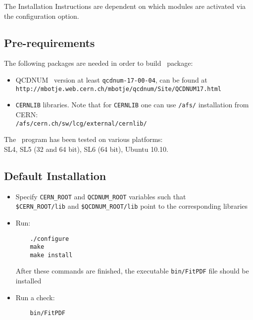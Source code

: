 
\label{sec:install}

The Installation Instructions are dependent on which modules are activated via the configuration option. 
\subsection{Pre-requirements}

The following packages are needed in order to build \fitter\ package:
\begin{itemize}
\item QCDNUM~\cite{qcdnum} version at least {\tt qcdnum-17-00-04}, can be found at \\
  {\tt http://mbotje.web.cern.ch/mbotje/qcdnum/Site/QCDNUM17.html}
\item {\tt CERNLIB} libraries. Note that for {\tt CERNLIB} one can use {\tt /afs/} installation from CERN:\\
  {\tt /afs/cern.ch/sw/lcg/external/cernlib/}
\end{itemize}
The \fitter\ program has been tested on various platforms:\\
   SL4, SL5 (32 and 64 bit), SL6 (64 bit),  Ubuntu 10.10.
\subsection{Default Installation}
\begin{itemize}
\item
 Specify {\tt CERN\_ROOT} 
     and {\tt QCDNUM\_ROOT} variables such that\\
     \verb'$CERN_ROOT/lib'  and \verb'$QCDNUM_ROOT/lib'
 point to the corresponding libraries
\item Run:
\begin{verbatim}
    ./configure
    make 
    make install
\end{verbatim}
After these commands are finished, the executable {\tt bin/FitPDF} 
file should be installed
\item  Run a check:
\begin{verbatim}
    bin/FitPDF 
\end{verbatim}
\end{itemize}
